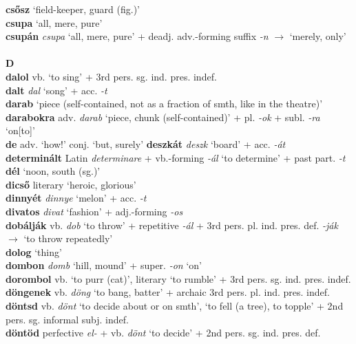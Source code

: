 \documentclass[11pt]{article}
\begin{document}
\textbf{csősz} `field-keeper, guard (fig.)' \\
\textbf{csupa} `all, mere, pure' \\
\textbf{csupán} \emph{csupa} `all, mere, pure' +
deadj. adv.\hyp{}forming suffix \emph{-n} $\rightarrow$ `merely, only' \\
\ \\
\noindent \textbf{\large D} \\
\textbf{dalol} vb. `to sing' + 3rd pers. sg. ind. pres. indef. \\
\textbf{dalt} \emph{dal} `song' + acc. \emph{-t} \\
\textbf{darab} `piece (self\hyp{}contained, not as a fraction of
  smth, like in the theatre)' \\
\textbf{darabokra} adv. \emph{darab} `piece, chunk (self\hyp{}contained)' +
  pl. \emph{-ok} + subl. \emph{-ra} `on[to]' \\
\textbf{de} adv. `how!' \textbar\textbar{} conj. `but, surely'
\textbf{deszkát} \emph{deszk} `board' + acc. \emph{-át} \\
\textbf{determinált} Latin \emph{determinare} + vb.\hyp{}forming \emph{-ál}
`to determine' + past part. \emph{-t} \\
\textbf{dél} `noon, south (sg.)' \\
\textbf{dicső} literary `heroic, glorious' \\
\textbf{dinnyét} \emph{dinnye} `melon' + acc. \emph{-t} \\
\textbf{divatos} \emph{divat} `fashion' +
adj.\hyp{}forming \emph{-os} \\
\textbf{dobálják} vb. \emph{dob} `to throw' + repetitive \emph{-ál} + 3rd
pers. pl. ind. pres. def. \emph{-ják} $\rightarrow$ `to throw
repeatedly' \\
\textbf{dolog} `thing' \\
\textbf{dombon} \emph{domb} `hill, mound' + super. \emph{-on} `on' \\
\textbf{dorombol} vb. `to purr (cat)', literary `to rumble' + 3rd
pers. sg. ind. pres. indef. \\
\textbf{döngenek} vb. \emph{döng} `to bang, batter' + archaic 3rd
pers. pl. ind. pres. indef. \\
\textbf{döntsd} vb. \emph{dönt} `to decide about or on
smth', \textbar\textbar{} `to fell
(a tree), to topple' + 2nd pers. sg. informal subj. indef. \\
\textbf{döntöd} perfective \emph{el-} + vb. \emph{dönt} `to
decide' + 2nd pers. sg. ind. pres. def. \\
\end{document}
